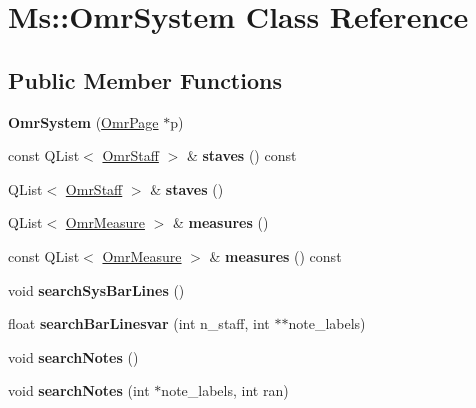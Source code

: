 \hypertarget{class_ms_1_1_omr_system}{}\section{Ms\+:\+:Omr\+System Class Reference}
\label{class_ms_1_1_omr_system}
\subsection*{Public Member Functions}
\begin{DoxyCompactItemize}
\item 
\mbox{\label{class_ms_1_1_omr_system_a0e8560cc0c5ba6f4a56b6c9b604adb86}} 
{\bfseries Omr\+System} (\hyperlink{class_ms_1_1_omr_page}{Omr\+Page} $\ast$p)
\item 
\mbox{\label{class_ms_1_1_omr_system_aeac70f5b97116ec66c8fdcdc2bb0ab7f}} 
const Q\+List$<$ \hyperlink{class_ms_1_1_omr_staff}{Omr\+Staff} $>$ \& {\bfseries staves} () const
\item 
\mbox{\label{class_ms_1_1_omr_system_af4003270cd7879396535ffdf8264d7cc}} 
Q\+List$<$ \hyperlink{class_ms_1_1_omr_staff}{Omr\+Staff} $>$ \& {\bfseries staves} ()
\item 
\mbox{\label{class_ms_1_1_omr_system_ae636682ed43043e90c48b5da2d2c9cc4}} 
Q\+List$<$ \hyperlink{class_ms_1_1_omr_measure}{Omr\+Measure} $>$ \& {\bfseries measures} ()
\item 
\mbox{\label{class_ms_1_1_omr_system_a78ae3be29a312972ea5fd630fc28c669}} 
const Q\+List$<$ \hyperlink{class_ms_1_1_omr_measure}{Omr\+Measure} $>$ \& {\bfseries measures} () const
\item 
\mbox{\label{class_ms_1_1_omr_system_a9c2d8dffd69d2c694974b1cae151efde}} 
void {\bfseries search\+Sys\+Bar\+Lines} ()
\item 
\mbox{\label{class_ms_1_1_omr_system_ab333e364b890bb27bd4c5bc0365b308a}} 
float {\bfseries search\+Bar\+Linesvar} (int n\+\_\+staff, int $\ast$$\ast$note\+\_\+labels)
\item 
\mbox{\label{class_ms_1_1_omr_system_a670927a0f8e96dc0775232176ae64aa6}} 
void {\bfseries search\+Notes} ()
\item 
\mbox{\label{class_ms_1_1_omr_system_a1a77a5ca0d24310f8150574af19ad930}} 
void {\bfseries search\+Notes} (int $\ast$note\+\_\+labels, int ran)
\end{DoxyCompactItemize}
